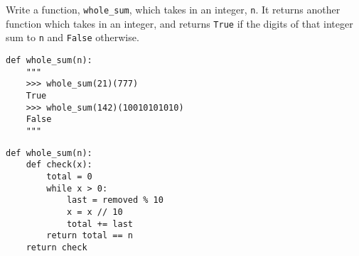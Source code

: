 \begin{blocksection}
\question Write a function, \texttt{whole\_sum}, which takes in an integer, \texttt{n}. It returns another function which takes in an integer, and returns \texttt{True} if the digits of that integer sum to \texttt{n} and \texttt{False} otherwise.

\begin{lstlisting}
def whole_sum(n): 
    """ 
    >>> whole_sum(21)(777)
    True
    >>> whole_sum(142)(10010101010)
    False
    """
\end{lstlisting}

\begin{solution}
\begin{lstlisting}
def whole_sum(n):
    def check(x):
        total = 0
        while x > 0:
            last = removed % 10
            x = x // 10
            total += last
        return total == n
    return check
\end{lstlisting}
\end{solution}
\end{blocksection}
